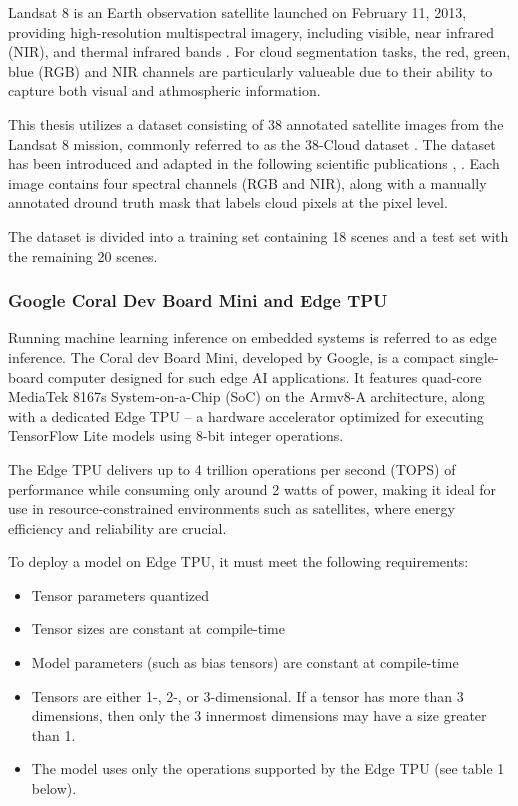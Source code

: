 {Landsat 8 is an Earth observation satellite launched on February 11, 2013, providing high-resolution multispectral imagery, including visible, near infrared (NIR), and thermal infrared bands \cite{landsat8}. For cloud segmentation tasks, the red, green, blue (RGB) and NIR channels are particularly valueable due to their ability to capture both visual and athmospheric information.

This thesis utilizes a dataset consisting of 38 annotated satellite images from the Landsat 8 mission, commonly referred to as the 38-Cloud dataset \cite{38cloud}. The dataset has been introduced and adapted in the following scientific publications \cite{CloudNet2019}, \cite{CloudDet2018}. Each image contains four spectral channels (RGB and NIR), along with a manually annotated dround truth mask that labels cloud pixels at the pixel level.

The dataset is divided into a training set containing 18 scenes and a test set with the remaining 20 scenes.

\subsubsection{Google Coral Dev Board Mini and Edge TPU}

Running machine learning inference on embedded systems is referred to as edge inference. The Coral dev Board Mini, developed by Google, is a compact single-board computer designed for such edge AI applications. It features quad-core MediaTek 8167s System-on-a-Chip (SoC) on the Armv8-A architecture, along with a dedicated Edge TPU – a hardware accelerator optimized for executing TensorFlow Lite models using 8-bit integer operations.

The Edge TPU delivers up to 4 trillion operations per second (TOPS) of performance while consuming only around 2 watts of power, making it ideal for use in resource-constrained environments such as satellites, where energy efficiency and reliability are crucial.

To deploy a model on Edge TPU, it must meet the following requirements:
\begin{itemize}
    \item Tensor parameters quantized
    \item Tensor sizes are constant at compile-time
    \item Model parameters (such as bias tensors) are constant at compile-time
    \item Tensors are either 1-, 2-, or 3-dimensional. If a tensor has more than 3 dimensions, then only the 3 innermost dimensions may have a size greater than 1.
    \item The model uses only the operations supported by the Edge TPU (see table 1 below). 
\end{itemize}

}
